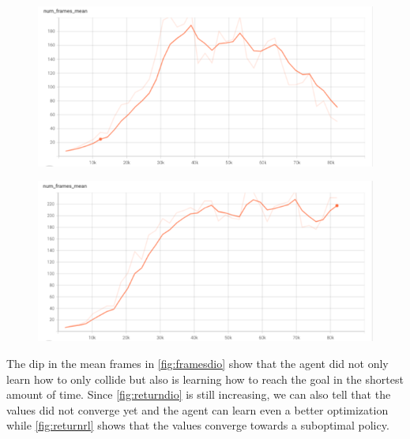     \begin{figure}[H]
      \centering
      \begin{minipage}{.5\textwidth}
        \centering
        \includegraphics[width=1\linewidth]{figures/dioframesmean.png}
        \label{fig:framesdio}
      \end{minipage}%
      \begin{minipage}{.5\textwidth}
        \centering
        \includegraphics[width=1\linewidth]{figures/rlframesmean.png}
        \label{fig:framesrl}
      \end{minipage}
    \end{figure}

    The dip in the mean frames in \ref{fig:framesdio} show that the agent did not only learn 
    how to only collide but also is learning how to reach the goal in the shortest amount of time. 
    Since \ref{fig:returndio} is still increasing, we can also tell that the values did not converge yet and 
    the agent can learn even a better optimization while \ref{fig:returnrl} shows that the values converge towards
    a suboptimal policy.

